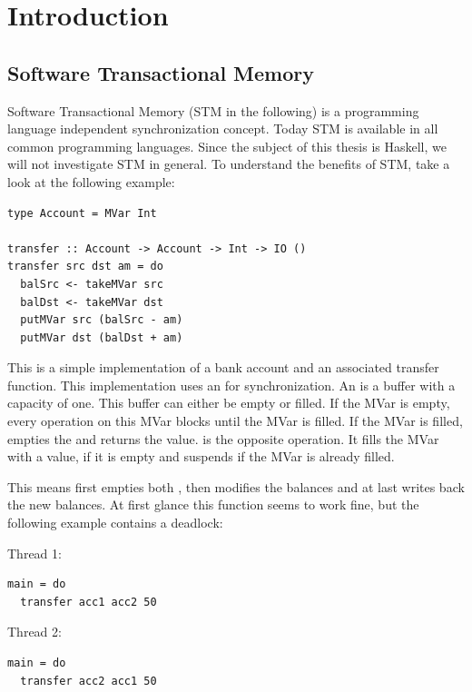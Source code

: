 
\chapter{Introduction} 

\label{Chapter1} 

\section{Software Transactional Memory}
\label{STMInterface}
Software Transactional Memory (STM in the following) is a programming language independent synchronization concept. Today STM is available 
in all common programming languages. Since the subject of this thesis is Haskell, we will not investigate STM in general.
To understand the benefits of STM, take a look at the following example:
\begin{lstlisting}
type Account = MVar Int

transfer :: Account -> Account -> Int -> IO ()
transfer src dst am = do
  balSrc <- takeMVar src
  balDst <- takeMVar dst
  putMVar src (balSrc - am)
  putMVar dst (balDst + am)
\end{lstlisting}
This is a simple implementation of a bank account and an associated transfer function. This implementation uses an 
for synchronization. An  is a buffer with a capacity of one. This buffer can either be empty or filled. If the MVar is empty,
every  operation on this MVar blocks until the MVar is filled. If the MVar is filled,  empties the 
 and returns the value.  is the opposite operation. It fills the MVar with a value, if it is empty and 
suspends if the MVar is already filled.

This means  first empties both , then modifies the balances and at last writes back the new balances.
At first glance this function seems to work fine, but the following example contains a deadlock:
\par\noindent
\begin{minipage}[t]{.45\textwidth}
Thread 1:
\begin{lstlisting}[frame=lrtb]
main = do
  transfer acc1 acc2 50
\end{lstlisting}
\end{minipage}
\hfill
\begin{minipage}[t]{.45\textwidth}
Thread 2:
\begin{lstlisting}[frame=lrtb]
main = do
  transfer acc2 acc1 50
\end{lstlisting}
\end{minipage}

